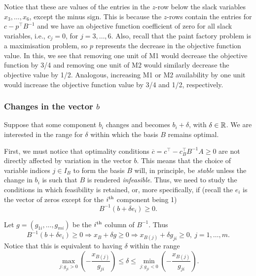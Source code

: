 Notice that these are values of the entries in the $z$-row below the slack variables $x_3, \dots, x_6$, except the minus sign. This is because the $z$-rows contain the entries for $c - p^\top B^{-1}$ and we have an objective function coefficient of zero for all slack variables, i.e., $c_j = 0$, for $j = 3,\dots,6$. Also, recall that the paint factory problem is a maximisation problem, so $p$ represents the decrease in the objective function value. In this, we see that removing one unit of M1 would decrease the objective function by 3/4 and removing one unit of M2 would similarly decrease the objective value by 1/2. Analogous, increasing M1 or M2 availability by one unit would increase the objective function value by 3/4 and 1/2, respectively. 


\subsubsection{Changes in the vector $b$}

Suppose that some component $b_i$ changes and becomes $b_i + \delta$, with $\delta \in \mathbb{R}$. We are interested in the range for $\delta$ within which the basis $B$ remains optimal.

First, we must notice that optimality conditions $\overline{c} = c^\top - c^\top_B B^{-1}A \geq 0$ are not directly affected by variation in the vector $b$. This means that the choice of variable indices $j \in I_B$ to form the basis $B$ will, in principle, be \emph{stable} unless the change in $b_i$ is such that $B$ is rendered \emph{infeasible}. Thus, we need to study the conditions in which  feasibility is retained, or, more specifically, if (recall the $e_i$ is the vector of zeros except for the $i^\text{th}$ component being 1)
%
\begin{equation*}
	B^{-1}(b + \delta e_i) \geq 0.	
\end{equation*}

Let $g = (g_{1i}, \dots, g_{mi})$ be the $i^\text{th}$ column of $B^{-1}$. Thus
%
\begin{equation*}
	B^{-1}(b + \delta e_i) \geq 0 \Rightarrow x_B + \delta g \geq 0 \Rightarrow x_{B(j)} + \delta g_{ji} \geq 0, \ j = 1,\dots, m.  
\end{equation*}
%
Notice that this is equivalent to having $\delta$ within the range
%
\begin{equation*}
	\max_{j : g_{ji} > 0}\left(-\frac{x_{B(j)}}{g_{ji}}\right) \leq \delta \leq \min_{j : g_{ji} < 0}\left(-\frac{x_{B(j)}}{g_{ji}}\right).	
\end{equation*}

